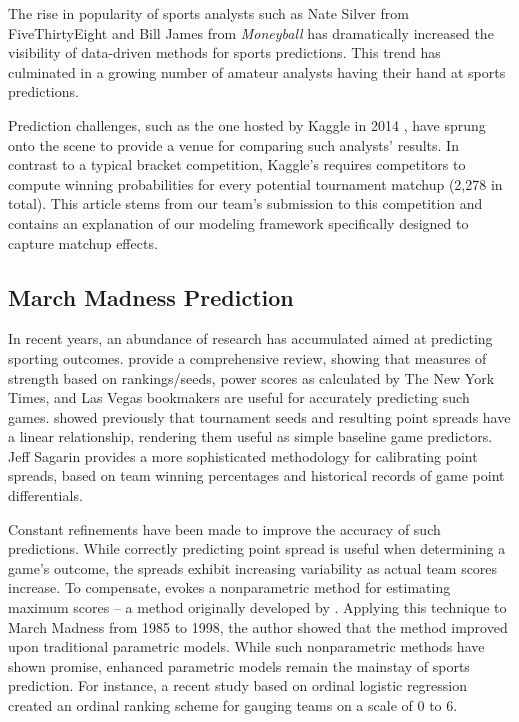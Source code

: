 \documentclass[letterpaper,12pt]{article}
\begin{document}
The rise in popularity of sports analysts such as Nate Silver from FiveThirtyEight \citep{silver} and Bill James from \emph{Moneyball} \citep{james, moneyball} has dramatically increased the visibility of data-driven methods for sports predictions. This trend has culminated in a growing number of amateur analysts having their hand at sports predictions. 

Prediction challenges, such as the one hosted by Kaggle in 2014 \citep{kaggle}, have sprung onto the scene to provide a venue for comparing such analysts' results. 
In contrast to a typical bracket competition, Kaggle's requires competitors to compute winning probabilities for every potential tournament matchup (2,278 in total). This article stems from our team's submission to this competition and contains an explanation of our modeling framework specifically designed to capture matchup effects. 
\subsection{March Madness Prediction \label{methods_review}}
In recent years, an abundance of research has accumulated aimed at predicting sporting outcomes. \cite{boulier2003predicting} provide a comprehensive review, showing that measures of strength based on  rankings/seeds, power scores as calculated by The New York Times,  and Las Vegas bookmakers are useful for accurately predicting such games. \cite{smith1999can} showed previously that tournament seeds and resulting point spreads have a linear relationship, rendering them useful as simple baseline game predictors. Jeff Sagarin \citep{sagarin} provides a more sophisticated methodology for calibrating point spreads, based on team winning percentages and historical records of game point differentials. 

Constant refinements have been made to improve the accuracy of such predictions. While correctly predicting point spread is useful when determining a game's outcome, the spreads exhibit increasing variability as actual team scores increase. To compensate, 
\cite{caudill2003predicting} evokes a nonparametric method for estimating maximum scores -- a method originally developed by \cite{manski1977estimation}.
Applying this technique to March Madness from 1985 to 1998, the author showed that the method improved upon traditional parametric models. While such nonparametric methods have shown promise, enhanced parametric models remain the mainstay of sports prediction. For instance, a recent study based on ordinal logistic regression \citep{west2006simple} created an ordinal ranking scheme for gauging teams on a scale of 0 to 6. 
\end{document}
